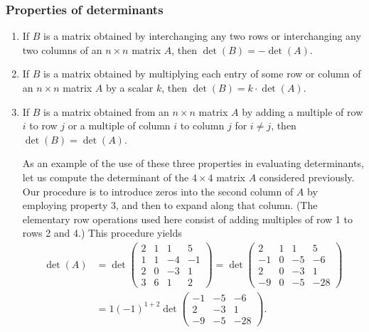 \documentclass{report}
\begin{document}
    \subsubsection*{Properties of determinants}

    \begin{enumerate}
        \item If $B$ is a matrix obtained by interchanging any two rows or interchanging any two columns of an $n \times n$ matrix $A$, then $\operatorname{det}(B)=-\operatorname{det}(A)$.

        \item If $B$ is a matrix obtained by multiplying each entry of some row or column of an $n \times n$ matrix $A$ by a scalar $k$, then $\operatorname{det}(B)=k \cdot \operatorname{det}(A)$.

        \item If $B$ is a matrix obtained from an $n \times n$ matrix $A$ by adding a multiple of row $i$ to row $j$ or a multiple of column $i$ to column $j$ for $i \neq j$, then $\operatorname{det}(B)=\operatorname{det}(A)$.

        As an example of the use of these three properties in evaluating determinants, let us compute the determinant of the $4 \times 4$ matrix $A$ considered previously. Our procedure is to introduce zeros into the second column of $A$ by employing property 3, and then to expand along that column. (The elementary row operations used here consist of adding multiples of row 1 to rows 2 and 4.) This procedure yields
        $$
        \begin{aligned}
        \operatorname{det}(A) & =\operatorname{det}\left(\begin{array}{rrrr}
        2 & 1 & 1 & 5 \\
        1 & 1 & -4 & -1 \\
        2 & 0 & -3 & 1 \\
        3 & 6 & 1 & 2
        \end{array}\right)=\operatorname{det}\left(\begin{array}{rrrr}
        2 & 1 & 1 & 5 \\
        -1 & 0 & -5 & -6 \\
        2 & 0 & -3 & 1 \\
        -9 & 0 & -5 & -28
        \end{array}\right) \\
        & =1(-1)^{1+2} \operatorname{det}\left(\begin{array}{rrr}
        -1 & -5 & -6 \\
        2 & -3 & 1 \\
        -9 & -5 & -28
        \end{array}\right) .
        \end{aligned}
        $$


\end{enumerate}
\end{document}
